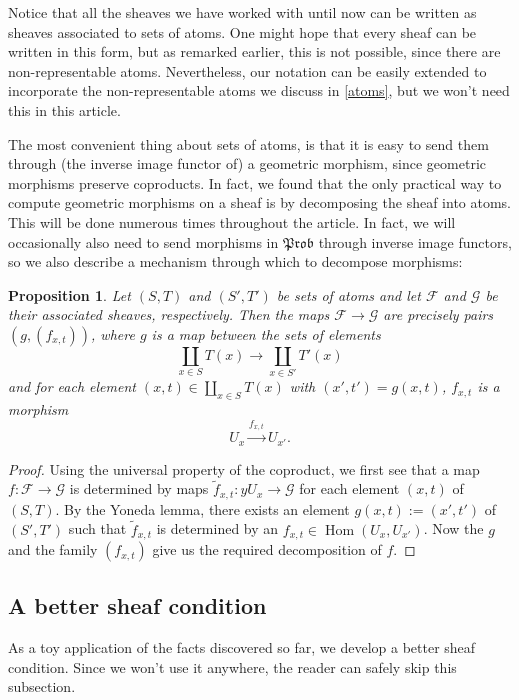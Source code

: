 \documentclass[a4paper]{amsproc}
\theoremstyle{plain}
\newtheorem{proposition}[theorem]{Proposition}
\theoremstyle{definition}
\theoremstyle{remark}
\numberwithin{equation}{section}
\DeclareMathOperator{\Hom}{Hom}
\newcommand{\y}{\textit{y}}
\newcommand{\Prob}{\mathfrak{Prob}}
\begin{document}
Notice that all the sheaves we have worked with until now can be written as sheaves associated to sets of atoms. One might hope that every sheaf can be written in this form, but as remarked earlier, this is not possible, since there are non-representable atoms. Nevertheless, our notation can be easily extended to incorporate the non-representable atoms we discuss in \ref{atoms}, but we won't need this in this article.

The most convenient thing about sets of atoms, is that it is easy to send them through (the inverse image functor of) a geometric morphism, since geometric morphisms preserve coproducts. In fact, we found that the only practical way to compute geometric morphisms on a sheaf is by decomposing the sheaf into atoms. This will be done numerous times throughout the article. In fact, we will occasionally also need to send morphisms in $\Prob$ through inverse image functors, so we also describe a mechanism through which to decompose morphisms:

\begin{proposition}\label{atom_coprod_maps}
    Let $(S,T)$ and $(S',T')$ be sets of atoms and let $\mathcal{F}$ and $\mathcal{G}$ be their associated sheaves, respectively. Then the maps $\mathcal{F} \to \mathcal{G}$ are precisely pairs $(g, (f_{x,t}))$, where $g$ is a map between the sets of elements
    \[
        \coprod_{x \in S} T(x) \to \coprod_{x \in S'} T'(x)
    \]
    and for each element $(x,t) \in \coprod_{x \in S} T(x)$ with $(x',t') = g(x,t)$, $f_{x,t}$ is a morphism
    \[
        U_x \xrightarrow{f_{x,t}} U_{x'} .
    \]
\end{proposition}
\begin{proof}
    Using the universal property of the coproduct, we first see that a map $f: \mathcal{F} \to \mathcal{G}$ is determined by maps $\tilde{f}_{x,t}: \y U_x \to \mathcal{G}$ for each element $(x,t)$ of $(S,T)$. By the Yoneda lemma, there exists an element $g(x,t) := (x',t')$ of $(S',T')$ such that $\tilde{f}_{x,t}$ is determined by an $f_{x,t} \in \Hom(U_x, U_{x'})$. Now the $g$ and the family $(f_{x,t})$ give us the required decomposition of $f$.
\end{proof}

\subsection{A better sheaf condition}

As a toy application of the facts discovered so far, we develop a better sheaf condition. Since we won't use it anywhere, the reader can safely skip this subsection.
\end{document}
